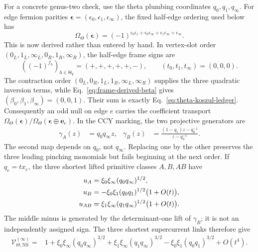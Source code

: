 \documentclass[11pt]{article}
\newcommand{\NS}{\mathrm{NS}}
\newcommand{\V}{\mathcal V}
\newcommand{\ve}{\bm e}
\begin{document}
For a concrete genus-two check, use the theta plumbing coordinates
\(q_0,q_1,q_\infty\).
For edge fermion parities
\(\bm\epsilon=(\epsilon_0,\epsilon_1,\epsilon_\infty)\), the fixed
half-edge ordering used below has
\begin{equation}
 \Omega_\Theta(\bm\epsilon)
 =(-1)^{\epsilon_0\epsilon_1+
        \epsilon_0\epsilon_\infty+
        \epsilon_1\epsilon_\infty+
        \epsilon_\infty}.
 \label{eq:theta-koszul-ledger}
\end{equation}
This is now derived rather than entered by hand.  In vertex-slot order
\((0_L,1_L,\infty_L,0_R,1_R,\infty_R)\), the half-edge frame signs are
\begin{equation}
 ((-1)^{f_h})_{h\in\mathsf H_V}=(+,+,+,+,+,-),
 \qquad (t_0,t_1,t_\infty)=(0,0,0).
 \label{eq:theta-frame-ledger}
\end{equation}
The contraction order \((0_L,0_R,1_L,1_R,\infty_L,\infty_R)\) supplies the
three quadratic inversion terms, while
Eq.~\eqref{eq:frame-derived-beta} gives
\((\beta_0,\beta_1,\beta_\infty)=(0,0,1)\).  Their sum is exactly
Eq.~\eqref{eq:theta-koszul-ledger}.
Consequently an odd null on edge \(e\) carries the coefficient transport
\(\Omega_\Theta(\bm\epsilon)/
  \Omega_\Theta(\bm\epsilon\oplus\ve_e)\).
In the CCY marking, the two projective generators are
\begin{align}
 \gamma_A(z)&=q_0q_\infty z,
 &\gamma_B(z)&=
 \frac{(1-q_1)z-q_0^{-1}}{z-q_0^{-1}}.
 \label{eq:theta-ccy-generators}
\end{align}
The second map depends on \(q_0\), not \(q_\infty\).  Replacing one by the
other preserves the three leading pinching monomials but fails beginning at
the next order.  If \(q_e=t x_e\), the three shortest lifted primitive
classes \(A,B,AB\) have
\begin{align}
 u_A&=\xi_0\xi_\infty(q_0q_\infty)^{1/2},
 \notag\\
 u_B&=-\xi_0\xi_1(q_0q_1)^{1/2}\bigl(1+O(t)\bigr),
 \notag\\
 u_{AB}&=\xi_1\xi_\infty(q_1q_\infty)^{1/2}\bigl(1+O(t)\bigr).
 \label{eq:theta-shortest-lifts}
\end{align}
The middle minus is generated by the determinant-one lift of \(\gamma_B\);
it is not an independently assigned sign.  The three shortest supercurrent
links therefore give
\begin{equation}
\begin{aligned}
 \V_{\Theta,\NS}^{(\infty)}
 ={}&1
 +\xi_0\xi_\infty(q_0q_\infty)^{3/2}
 +\xi_1\xi_\infty(q_1q_\infty)^{3/2}
 -\xi_0\xi_1(q_0q_1)^{3/2}
 +O(t^4).
\end{aligned}
 \label{eq:theta-vacuum-leading}
\end{equation}
\end{document}
